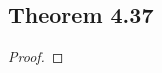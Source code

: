\documentclass[../../main.tex]{subfiles}
\begin{document}
\subsection{Theorem 4.37}
\begin{wts}

\end{wts}
\begin{proof}

\end{proof}
\end{document}
